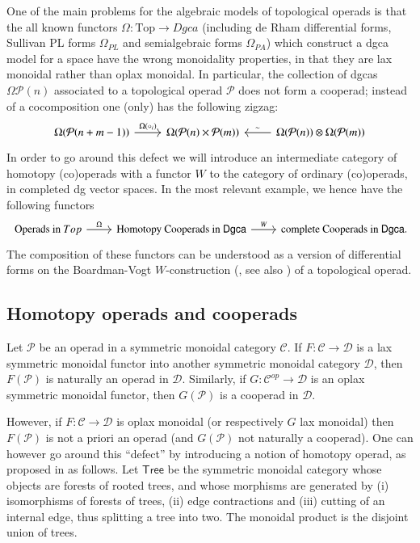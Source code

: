 \documentclass[a4paper]{amsart}
\theoremstyle{plain}
\theoremstyle{definition}
\newcommand{\op}{\mathcal}
\newcommand{\dgca}{\mathsf{Dgca}}
\newcommand{\mC}{{\mathcal{C}}}
\newcommand{\mD}{{\mathcal{D}}}
\newcommand{\Tree}{{\mathsf{Tree}}}
\begin{document}
One of the main problems for the algebraic models of topological  operads is that the all known functors $\Omega:\mathrm{Top} \rightarrow Dgca$ (including de Rham differential forms, Sullivan PL forms $\Omega_{PL}$ and semialgebraic forms $\Omega_{PA}$)  which construct a dgca model for a space  have the wrong monoidality properties, in that they are lax monoidal rather than oplax monoidal. In particular, the collection of dgcas $\Omega\op P(n)$ associated to a topological operad $\op P$ does not form a cooperad; instead of a cocomposition one (only) has the following zigzag:
\[
\begin{tikzcd}
\Omega(\op P(n+m-1)) \ar{r}{\Omega(\circ_i)} 
&
\Omega({\op P}(n) \times {\op P}(m))
&
\Omega({\op P}(n)) \otimes \Omega( {\op P}(m))
 \ar{l}[above]{\sim}
\end{tikzcd}
\]
In order to go around this defect we will introduce an intermediate category of homotopy (co)operads with a functor $W$ to the category of ordinary (co)operads, in completed dg vector spaces.
In the most relevant example, we hence have the following functors
\[
\begin{tikzcd}
\text{ Operads in }{Top} \ar{r}{\Omega} 
& \text{Homotopy Cooperads in $\dgca$} \ar{r}{W}
&  \text{complete Cooperads in $\dgca$}.
\end{tikzcd}
\]
The composition of these functors can be understood as a version of differential forms on the Boardman-Vogt $W$-construction (\cite{BoVo}, see also \cite{BM}) of a topological operad. 

\subsection{Homotopy operads and cooperads}

Let $\op P$ be an operad in a symmetric monoidal category $\mC$. If $F:\mC\to \mD$ is a lax symmetric monoidal functor into another symmetric monoidal category $\mD$, then $F(\op P)$ is naturally an operad in $\mD$.
Similarly, if $G:\mC^{op}\to \mD$ is an oplax symmetric monoidal functor, then $G(\op P)$ is a cooperad in $\mD$.

However, if $F:\mC\to \mD$ is oplax monoidal (or respectively $G$ lax monoidal) then $F(\op P)$ is not a priori an operad (and $G(\op P)$ not naturally a cooperad). 
One can however go around this ``defect'' by introducing a notion of homotopy operad, as proposed in \cite[section 3]{LV} as follows.
Let $\Tree$ be the symmetric monoidal category whose objects are forests of rooted trees, and whose morphisms are generated by (i) isomorphisms of forests of trees, (ii) edge contractions and (iii) cutting of an internal edge, thus splitting a tree into two. The monoidal product is the disjoint union of trees.
\end{document}
